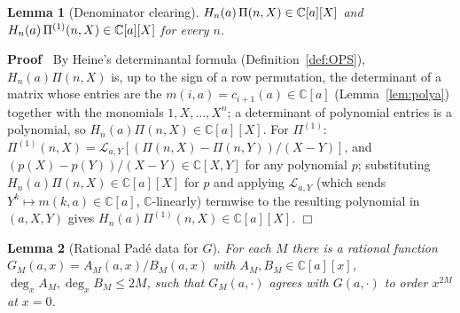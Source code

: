 \documentclass{article}
\newenvironment{proof}{\noindent\textbf{Proof\ }}{\hspace*{\fill}$\Box$\medskip}
\newtheorem{lemma}{Lemma}
{\theorembodyfont{\rmfamily\small}\newtheorem{problem}{Problem}}
\newcommand{\C}{\mathbb{C}}
\newcommand{\Lop}{\mathcal{L}}
\begin{document}
\begin{lemma}
  [Denominator clearing]\label{lem:clearing} $H_n (a)  \hspace{0.17em} \Pi
  (n, X) \in \C [a] [X]$ and $H_n (a)  \hspace{0.17em} \Pi^{(1)} (n, X) \in
  \C [a] [X]$ for every $n$.
\end{lemma}

\begin{proof}
  By Heine's determinantal formula (Definition~\ref{def:OPS}), $H_n (a) \Pi
  (n, X)$ is, up to the sign of a row permutation, the determinant of a
  matrix whose entries are the $m (i, a) = c_{i + 1} (a) \in \C [a]$
  (Lemma~\ref{lem:polya}) together with the monomials $1, X, \ldots, X^n$;
  a determinant of polynomial entries is a polynomial, so $H_n (a) \Pi (n,
  X) \in \C [a] [X]$. For $\Pi^{(1)}$: $\Pi^{(1)} (n, X) = \Lop_{a, Y} [(\Pi
  (n, X) - \Pi (n, Y)) / (X - Y)]$, and $(p (X) - p (Y)) / (X - Y) \in \C [X,
  Y]$ for any polynomial $p$; substituting $H_n (a) \Pi (n, X) \in \C [a]
  [X]$ for $p$ and applying $\Lop_{a, Y}$ (which sends $Y^k \mapsto m (k, a)
  \in \C [a]$, $\C$-linearly) termwise to the resulting polynomial in $(a, X,
  Y)$ gives $H_n (a) \Pi^{(1)} (n, X) \in \C [a] [X]$.
\end{proof}

\begin{lemma}
  [Rational Pad{\'e} data for $G$]\label{lem:GMdata} For each $M$ there is a
  rational function $G_M (a, x) = A_M (a, x) / B_M (a, x)$ with $A_M, B_M
  \in \C [a] [x]$, $\deg_x A_M, \deg_x B_M \le 2 M$, such that $G_M (a,
  \cdot)$ agrees with $G (a, \cdot)$ to order $x^{2 M}$ at $x = 0$.
\end{lemma}
\end{document}

